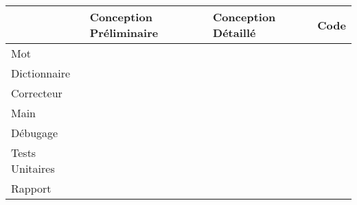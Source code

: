 \documentclass[11pt,a4paper]{article}
\begin{document}
         \begin{center}
            \begin{tabular}{ | l | l | l | l | } \hline
                & Conception Préliminaire & Conception Détaillé & Code \\ \hline
                Mot & & & \\ \hline
                Dictionnaire &  & & \\ \hline
                Correcteur  &  & & \\ \hline
                Main &  & & \\ \hline
                Débugage &  & & \\ \hline
                Tests Unitaires &  & & \\ \hline
                Rapport &  & & \\ \hline
            \end{tabular}
        \end{center}
\end{document}
